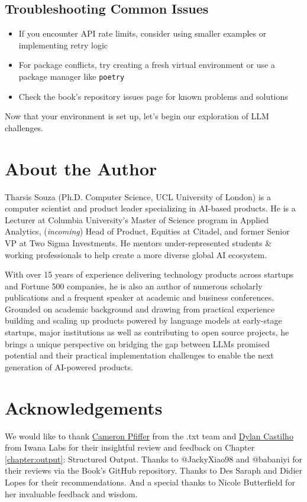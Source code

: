 \subsection{Troubleshooting Common Issues}
\begin{itemize}
    \item If you encounter API rate limits, consider using smaller examples or implementing retry logic
    \item For package conflicts, try creating a fresh virtual environment or use a package manager like \texttt{poetry}
    \item Check the book's repository issues page for known problems and solutions
\end{itemize}

Now that your environment is set up, let's begin our exploration of LLM challenges.

\section{About the Author}

Tharsis Souza (Ph.D. Computer Science, UCL University of London) is a computer scientist and product leader specializing in AI-based products. He is a Lecturer at Columbia University's Master of Science program in Applied Analytics, (\textit{incoming}) Head of Product, Equities at Citadel, and former Senior VP at Two Sigma Investments. He mentors under-represented students \& working professionals to help create a more diverse global AI ecosystem.

With over 15 years of experience delivering technology products across startups and Fortune 500 companies, he is also an author of numerous scholarly publications and a frequent speaker at academic and business conferences. Grounded on academic background and drawing from practical experience building and scaling up products powered by language models at early-stage startups, major institutions as well as contributing to open source projects, he brings a unique perspective on bridging the gap between LLMs promised potential and their practical implementation challenges to enable the next generation of AI-powered products.

\section{Acknowledgements}

We would like to thank \href{https://x.com/cameron_pfiffer}{Cameron Pfiffer} from the .txt team and \href{https://dylancastillo.co/}{Dylan Castilho} from Iwana Labs for their insightful review and feedback on Chapter \ref{chapter:output}: Structured Output. Thanks to @JackyXiao98 and @babaniyi for their reviews via the Book's GitHub repository. Thanks to Des Saraph and Didier Lopes for their recommendations. And a special thanks to Nicole Butterfield for her invaluable feedback and wisdom.

